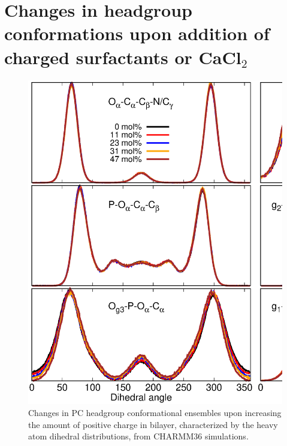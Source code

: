 \documentclass[journal=jpcbfk]{achemso}
\begin{document}
\clearpage
\section{Changes in headgroup conformations upon addition of charged surfactants or CaCl$_2$}

\begin{figure}[]
  \centering
  \includegraphics[width=12.0cm]{./Figs/HGorderparametersPCvsSURFdihedrals.eps}
  \caption{\label{HGorderparametersPCvsSURFdihedrals}
    Changes in PC headgroup conformational ensembles upon increasing the amount of positive charge in bilayer,
    characterized by the heavy atom dihedral distributions, from CHARMM36 simulations.
  }
\end{figure}
\end{document}
